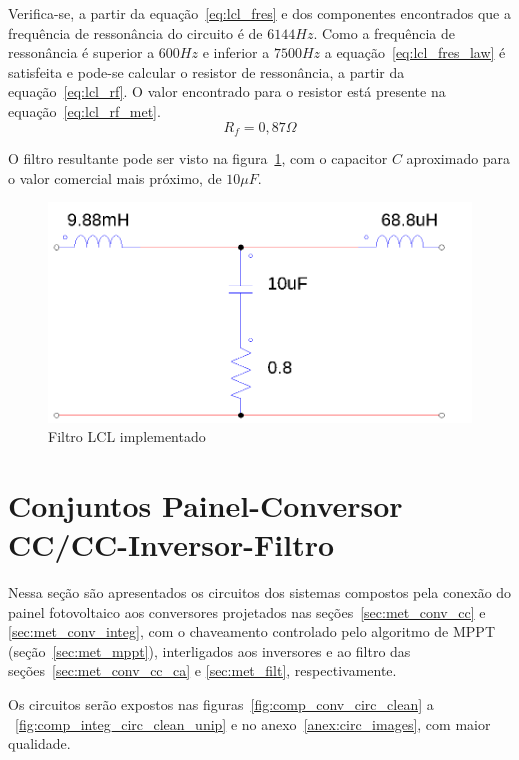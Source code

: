 \documentclass[
	12pt,				%
	openany,
	onseside,
	a4paper,			%
	english,			%
	french,				%
	spanish,			%
	brazil,				%
	]{abntex2}
\begin{document}
Verifica-se, a partir da equação~\ref{eq:lcl_fres} e dos componentes encontrados que a frequência de ressonância do circuito é de $6144Hz$. Como a frequência de ressonância é superior a $600Hz$ e inferior a $7500Hz$ a equação~\ref{eq:lcl_fres_law} é satisfeita e pode-se calcular o resistor de ressonância, a partir da equação~\ref{eq:lcl_rf}. O valor encontrado para o resistor está presente na equação~\ref{eq:lcl_rf_met}.
\begin{equation}%
	R_f = 0,87 \Omega \label{eq:lcl_rf_met}
\end{equation}

O filtro resultante pode ser visto na figura~\ref{fig:lcl_filter_impl}, com o capacitor $C$ aproximado para o valor comercial mais próximo, de $10 \mu F$.

\begin{figure}[htb]%
	\begin{center}%
		\includegraphics[width=0.65 \linewidth]{lcl_filter_psim}
		\caption{Filtro LCL implementado}
		\label{fig:lcl_filter_impl}
	\end{center}
\end{figure}

\section{Conjuntos Painel-Conversor CC/CC-Inversor-Filtro}

Nessa seção são apresentados os circuitos dos sistemas compostos pela conexão do painel fotovoltaico aos conversores projetados nas seções~\ref{sec:met_conv_cc} e \ref{sec:met_conv_integ}, com o chaveamento controlado pelo algoritmo de MPPT (seção~\ref{sec:met_mppt}), interligados aos inversores e ao filtro das seções~\ref{sec:met_conv_cc_ca} e \ref{sec:met_filt}, respectivamente.

Os circuitos serão expostos nas figuras~\ref{fig:comp_conv_circ_clean} a ~\ref{fig:comp_integ_circ_clean_unip} e no anexo~\ref{anex:circ_images}, com maior qualidade.
\end{document}
